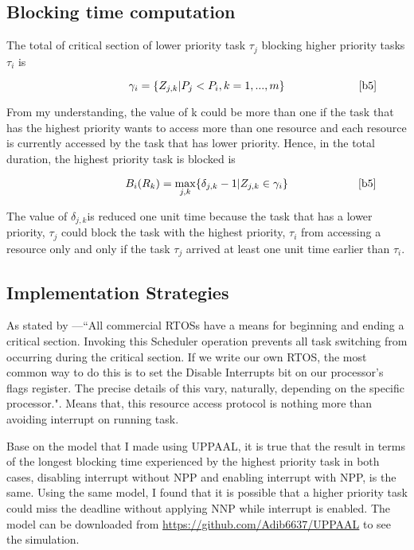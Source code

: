 \subsection{Blocking time computation}

	The total of critical section of lower priority task $\tau_{j}$ blocking higher priority tasks $\tau_{i}$ is

\begin{equation}
\citeequation{ \gamma_{i}=\{Z_{j,k} | P_{j}<P_{i}, k=1,...,m \}}{b5}\label{eq6}
\end{equation}

From my understanding, the value of k could be more than one if the task that has the highest priority wants to access more than one resource and each resource is currently accessed by the task that has lower priority. Hence, in the total duration, the highest priority task is blocked is

\begin{equation}
\citeequation{B_{i}(R_{k})=\underset{j,k}{\mathrm{max}} \{ \delta_{j,k}-1 | Z_{j,k} \in \gamma_{i}\}}{b5}\label{eq7}
\end{equation}


The value of $\delta_{j,k}$is reduced one unit time because the task that has a lower priority, $\tau_{j}$ could block the task with the highest priority, $\tau_{i}$ from accessing a resource only and only if the task $\tau_{j}$  arrived at least one unit time earlier than $\tau_{i}$.

\subsection{Implementation Strategies}

As stated by \cite{b6}---``All commercial RTOSs have a means for beginning and ending a critical section. Invoking this Scheduler operation prevents all task switching from occurring during the critical section. If we write our own RTOS, the most common way to do this is to set the Disable Interrupts bit on our processor's flags register. The precise details of this vary, naturally, depending on the specific processor.". Means that, this resource access protocol is nothing more than avoiding interrupt on running task. 

Base on the model that I made using UPPAAL, it is true that the result in terms of the longest blocking time experienced by the highest priority task in both cases, disabling interrupt without NPP and enabling interrupt with NPP, is the same. Using the same model, I found that it is possible that a higher priority task could miss the deadline without applying NNP while interrupt is enabled. The model can be downloaded from \url{https://github.com/Adib6637/UPPAAL} to see the simulation.

